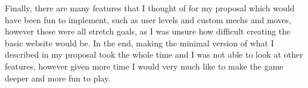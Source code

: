 \documentclass{article}
\begin{document}
Finally, there are many features that I thought of for my proposal which would have been fun to implement, such as user levels and custom mechs and moves, however these were all stretch goals, as I was unsure how difficult creating the basic website would be. In the end, making the minimal version of what I described in my proposal took the whole time and I was not able to look at other features, however given more time I would very much like to make the game deeper and more fun to play.














%
%
%
%
%
%
%
\end{document}
